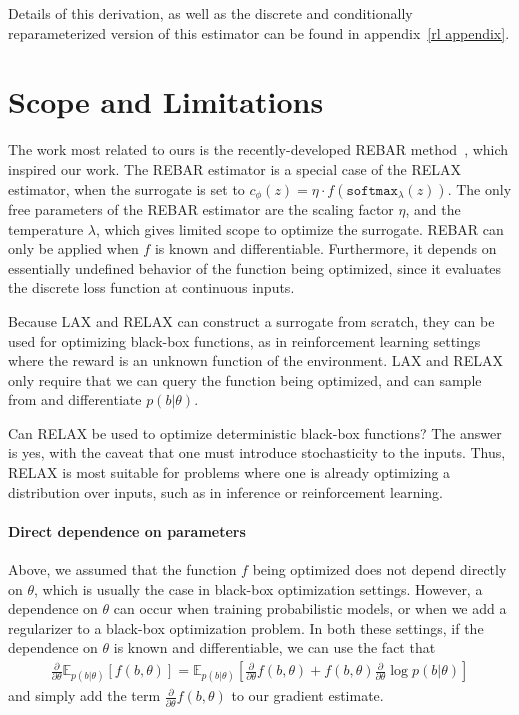 \documentclass{article}
\newcommand{\E}{\mathbb{E}}
\newcommand{\PT}{\frac{\partial}{\partial \theta}}
\newcommand{\LAX}{{\textnormal{LAX}}}
\newcommand{\RELAX}{{\textnormal{RELAX}}}
\begin{document}
Details of this derivation, as well as the discrete and conditionally reparameterized version of this estimator can be found in appendix~\ref{rl appendix}.

\section{Scope and Limitations}
\label{limitations}
The work most related to ours is the recently-developed REBAR method~\citep{tucker2017rebar}, which inspired our work.
The REBAR estimator is a special case of the \RELAX{} estimator, when the surrogate is set to ${c_\phi(z) = \eta \cdot f(\texttt{softmax}_\lambda(z))}$.
The only free parameters of the REBAR estimator are the scaling factor $\eta$, and the temperature $\lambda$, which gives limited scope to optimize the surrogate.
REBAR can only be applied when $f$ is known and differentiable.
Furthermore, it depends on essentially undefined behavior of the function being optimized, since it evaluates the discrete loss function at continuous inputs.

Because \LAX{} and \RELAX{} can construct a surrogate from scratch, they can be used for optimizing black-box functions, as in reinforcement learning settings where the reward is an unknown function of the environment.
\LAX{} and \RELAX{} only require that we can query the function being optimized, and can sample from and differentiate $p(b|\theta)$.

Can \RELAX{} be used to optimize deterministic black-box functions?
The answer is yes, with the caveat that one must introduce stochasticity to the inputs.
Thus, \RELAX{} is most suitable for problems where one is already optimizing a distribution over inputs, such as in inference or reinforcement learning.

\paragraph{Direct dependence on parameters}
Above, we assumed that the function $f$ being optimized does not depend directly on $\theta$, which is usually the case in black-box optimization settings.
However, a dependence on $\theta$ can occur when training probabilistic models, or when we add a regularizer to a black-box optimization problem.
In both these settings, if the dependence on $\theta$ is known and differentiable, we can use the fact that
%
\begin{align}
\PT \E_{p(b|\theta)}[f(b, \theta)] = \E_{p(b|\theta)}\left[\PT f(b, \theta) + f(b, \theta)\PT \log p(b|\theta) \right]
\end{align}
%
and simply add the term $\PT f(b, \theta)$ to our gradient estimate.
\end{document}
